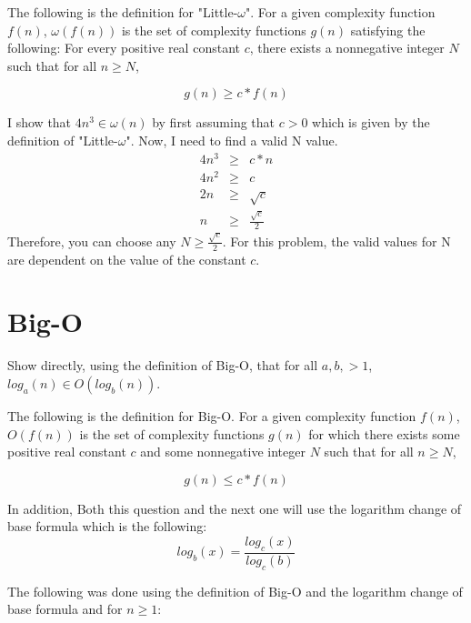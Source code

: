 \documentclass[11pt]{article}
\begin{document}
\bigskip
\bigskip
The following is the definition for "Little-$\omega$". For a given complexity function $f(n)$, $\omega(f(n))$ is the set of complexity functions $g(n)$ satisfying the following: For every positive real constant $c$, there exists a nonnegative integer $N$ such that for all $n \geq N$,

\begin{equation*}
g(n) \geq c * f(n)
\end{equation*}


\bigskip
\bigskip
I show that $4n^3 \in \omega(n)$ by first assuming that $c>0$ which is given by the definition of "Little-$\omega$". Now, I need to find a valid N value.
\begin{eqnarray*}
4n^3 &\geq& c*n \\
4n^2 &\geq& c\\
2n &\geq& \sqrt{c}\\
n &\geq& \frac{\sqrt{c}}{2}
\end{eqnarray*}
Therefore, you can choose any $N \geq \frac{\sqrt{c}}{2}$. For this problem, the valid values for N are dependent on the value of the constant $c$.


\section{Big-O}
Show directly, using the definition of Big-O, that for all $a,b, >1$,  $log_a(n) \in O(log_b(n))$.

\bigskip
\bigskip

The following is the definition for Big-O. For a given complexity function $f(n)$, $O(f(n))$ is the set of complexity functions $g(n)$ for which there exists some positive real constant $c$ and some nonnegative integer $N$ such that for all $n \geq N$,

\begin{equation*}
g(n) \leq c * f(n)
\end{equation*}

\bigskip
\bigskip

In addition, Both this question and the next one will use the logarithm change of base formula which is the following:
\begin{equation*}
log_b(x) = \frac{log_c(x)}{log_c(b)}
\end{equation*}

\bigskip
\bigskip

The following was done using the definition of Big-O and the logarithm change of base formula and for $n \geq 1$:
\end{document}
